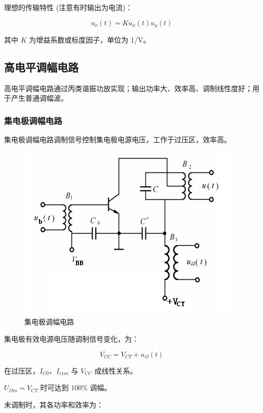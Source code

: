 理想的传输特性 (注意有时输出为电流)：

\begin{equation}
    u_o(t) = K u_x(t) u_y(t)
\end{equation}

其中 $K$ 为增益系数或标度因子，单位为 1/V。

\subsection{高电平调幅电路}

高电平调幅电路通过丙类谐振功放实现；输出功率大、效率高、调制线性度好；用于产生普通调幅波。

\subsubsection{集电极调幅电路}

集电极调幅电路调制信号控制集电极电源电压，工作于过压区，效率高。

\begin{figure}[htbp]
    \centering
    \includegraphics[scale=0.6]{image/Picture15.png}
    \caption{集电极调幅电路}
\end{figure}

集电极有效电源电压随调制信号变化，为：

\begin{equation}
    V_{CC} = V_{CT} + u_{\Omega}(t)
\end{equation}

在过压区，$I_{C0}$、$I_{c1m}$ 与 $V_{CC}$ 成线性关系。

$U_{\Omega m} = V_{CT}$ 时可达到 $100\%$ 调幅。

未调制时，其各功率和效率为：

